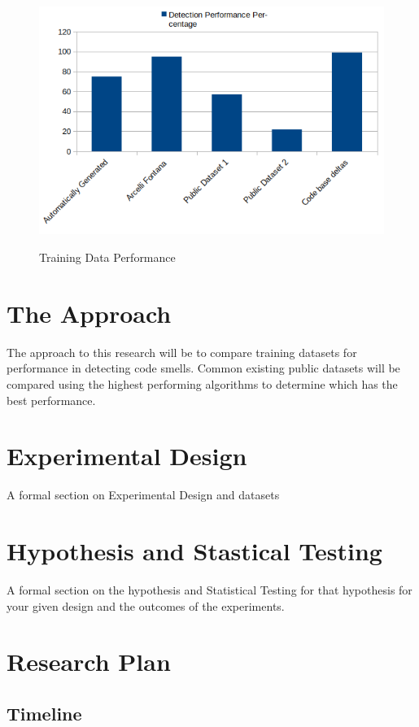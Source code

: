 \documentclass[conference]{IEEEtran}
\begin{document}
\begin{figure}[ht]{
  \includegraphics[width=\columnwidth]{teaser.png}}
  \caption{Training Data Performance}
  \label{fig:ts}
\end{figure} 

\section{The Approach}
The approach to this research will be to compare training datasets for performance in detecting code smells.
Common existing public datasets will be compared using the highest performing algorithms to determine which has the best performance.

\section{Experimental Design}
A formal section on Experimental Design and datasets 
\section{Hypothesis and Stastical Testing}
A formal section on the hypothesis and Statistical Testing for that hypothesis for your given design and the outcomes of the experiments.

\section{Research Plan}

\subsection{Timeline}





\end{document}
